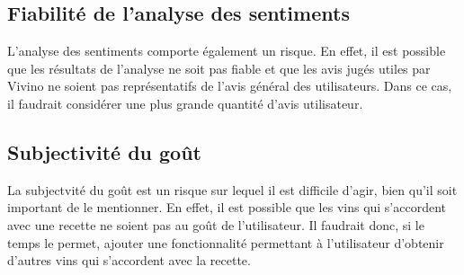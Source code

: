 \subsection{Fiabilité de l'analyse des sentiments}

L'analyse des sentiments comporte également un risque. En effet, il est possible que les résultats de l'analyse ne soit pas fiable et que les avis jugés utiles par Vivino ne soient pas représentatifs de l'avis général des utilisateurs. Dans ce cas, il faudrait considérer une plus grande quantité d'avis utilisateur.

\subsection{Subjectivité du goût}

La subjectvité du goût est un risque sur lequel il est difficile d'agir, bien qu'il soit important de le mentionner. En effet, il est possible que les vins qui s'accordent avec une recette ne soient pas au goût de l'utilisateur. Il faudrait donc, si le temps le permet, ajouter une fonctionnalité permettant à l'utilisateur d'obtenir d'autres vins qui s'accordent avec la recette.